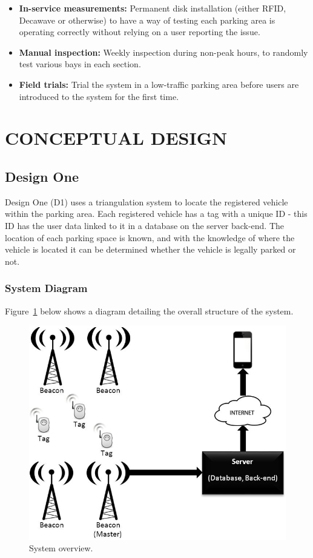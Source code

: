 \begin{itemize}
\item \textbf{In-service measurements:} Permanent disk installation (either RFID, Decawave or otherwise) to have a way of testing each parking area is operating correctly without relying on a user reporting the issue.
\item \textbf{Manual inspection:} Weekly inspection during non-peak hours, to randomly test various bays in each section.
\item \textbf{Field trials:} Trial the system in a low-traffic parking area before users are introduced to the system for the first time.
\end{itemize}

\newpage
\section{CONCEPTUAL DESIGN}
\subsection{Design One}
Design One (D1) uses a triangulation system to locate the registered vehicle within the parking area. Each registered vehicle has a tag with a unique ID - this ID has the user data linked to it in a database on the server back-end. The location of each parking space is known, and with the knowledge of where the vehicle is located it can be determined whether the vehicle is legally parked or not. 
  
\subsubsection{System Diagram}
Figure~\ref{fig:soft-overview2} below shows a diagram detailing the overall structure of the system. 

\begin{figure}[H]
\begin{center}
\includegraphics[scale=0.5]{data/software/1.jpg}
\caption{System overview.}
\label{fig:soft-overview2}
\end{center}
\end{figure}

